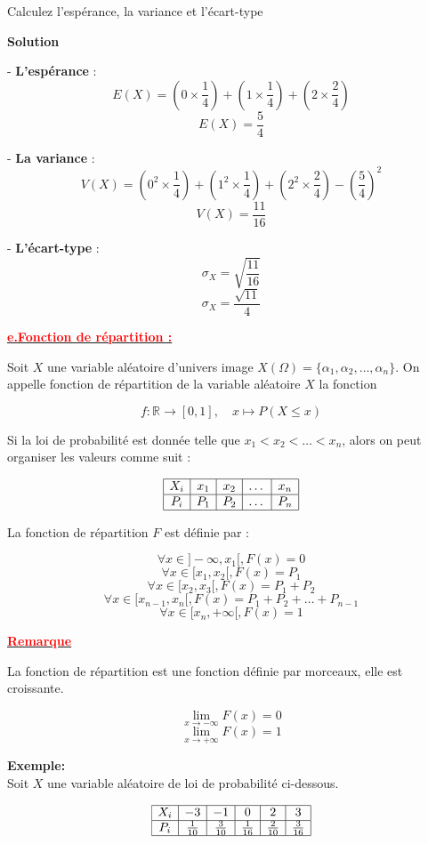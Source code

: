 \documentclass[12pt]{article}
\begin{document}
 Calculez l'espérance, la variance et l'écart-type

\textbf{Solution}

- \textbf{L'espérance} : 
\[
E(X) = \left(0 \times \frac{1}{4}\right) + \left(1 \times \frac{1}{4}\right) + \left(2 \times \frac{2}{4}\right)
\]
\[
E(X) = \frac{5}{4}
\]

- \textbf{La variance} : 
\[
V(X) = \left(0^2 \times \frac{1}{4}\right) + \left(1^2 \times \frac{1}{4}\right) + \left(2^2 \times \frac{2}{4}\right) - \left(\frac{5}{4}\right)^2
\]
\[
V(X) = \frac{11}{16}
\]

- \textbf{L'écart-type} : 
\[
\sigma_X = \sqrt{\frac{11}{16}} 
\]
\[
\sigma_X = \frac{\sqrt{11}}{4}
\]

\underline{\textbf{\textcolor{red}{e.Fonction de répartition :}}}

Soit \( X \) une variable aléatoire d'univers image \( X(\Omega) = \{ \alpha_1, \alpha_2, \dots, \alpha_n \} \). On appelle fonction de répartition de la variable aléatoire \( X \) la fonction

\[
f : \mathbb{R} \to [0, 1], \quad x \mapsto P(X \leq x)
\]

Si la loi de probabilité est donnée telle que \( x_1 < x_2 < \dots < x_n \), alors on peut organiser les valeurs comme suit :

\[
\begin{array}{|c|c|c|c|c|}
\hline
X_i & x_1 & x_2 & \dots & x_n \\
\hline
P_i & P_1 & P_2 & \dots & P_n \\
\hline
\end{array}
\]

La fonction de répartition \( F \) est définie par :

\[
\forall x \in]-\infty, x_1[, F(x) = 0
\]
\[
\forall x \in [x_1, x_2[, F(x) = P_1
\]
\[
\forall x \in [x_2, x_3[, F(x) = P_1 + P_2
\]
\[
\forall x \in [x_{n-1}, x_n[, F(x) = P_1 + P_2 + \dots + P_{n-1}
\]
\[
\forall x \in [x_n, +\infty[, F(x) = 1
\]


\underline{\textbf{\textcolor{red}{Remarque}}}

La fonction de répartition est une fonction définie par morceaux, elle est croissante.

\[
\lim_{x \to -\infty} F(x) = 0
\]
\[
\lim_{x \to +\infty} F(x) = 1
\]

\textbf{Exemple:} \\
Soit \( X \) une variable aléatoire de loi de probabilité ci-dessous.

\[
\begin{array}{|c|c|c|c|c|c|}
\hline
X_i & -3 & -1 & 0 & 2 & 3 \\
\hline
P_i & \frac{1}{10} & \frac{3}{10} & \frac{1}{16} & \frac{2}{10} & \frac{3}{16} \\
\hline
\end{array}
\]
\end{document}
